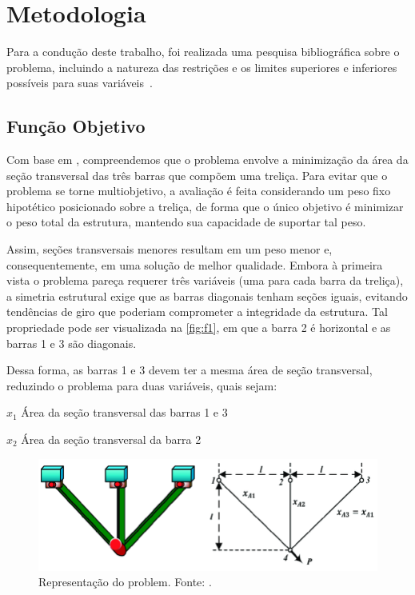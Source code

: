 \section{Metodologia}%
\label{sec:metodologia}

Para a condução deste trabalho, foi realizada uma pesquisa bibliográfica sobre o problema, incluindo a natureza das restrições e os limites superiores e inferiores possíveis para suas variáveis~\cite{HEIDARI2019849}.

\subsection{Função Objetivo}

Com base em , compreendemos que o problema envolve a minimização da área da seção transversal das três barras que compõem uma treliça. Para evitar que o problema se torne multiobjetivo, a avaliação é feita considerando um peso fixo hipotético posicionado sobre a treliça, de forma que o único objetivo é minimizar o peso total da estrutura, mantendo sua capacidade de suportar tal peso.

Assim, seções transversais menores resultam em um peso menor e, consequentemente, em uma solução de melhor qualidade. Embora à primeira vista o problema pareça requerer três variáveis (uma para cada barra da treliça), a simetria estrutural exige que as barras diagonais tenham seções iguais, evitando tendências de giro que poderiam comprometer a integridade da estrutura.
Tal propriedade pode ser visualizada na \autoref{fig:f1}, em que a barra 2 é horizontal e as barras 1 e 3 são diagonais.

Dessa forma, as barras 1 e 3 devem ter a mesma área de seção transversal, reduzindo o problema para duas variáveis, quais sejam:
\begin{symbols}
    \item[\(x_1\) Área da seção transversal das barras 1 e 3]
    \item[\(x_2\) Área da seção transversal da barra 2]
\end{symbols}

\begin{figure}[!ht]%
    \centering
    \includegraphics[scale=1]{images/Three-Bar-Truss-Design.png}
    \caption{Representação do \gls{problem}. Fonte: .}%
    \label{fig:f1}
\end{figure}

